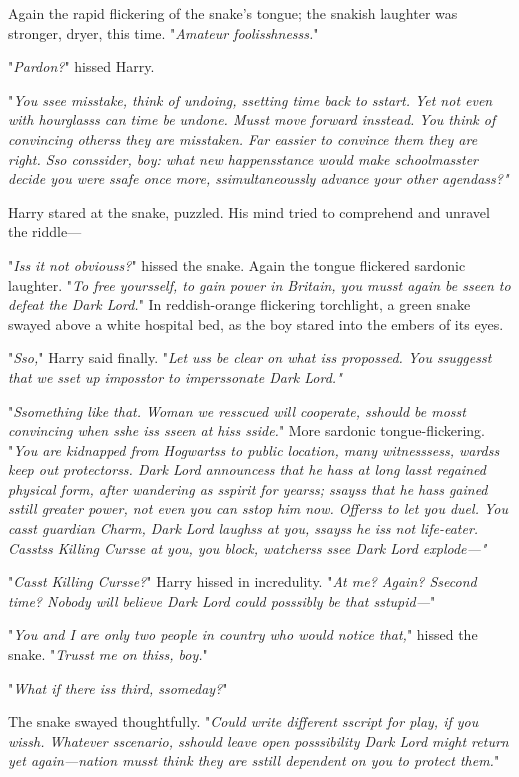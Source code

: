 Again the rapid flickering of the snake's tongue; the snakish laughter was 
stronger, dryer, this time. "\emph{Amateur foolisshnesss.}"

"\emph{Pardon?}" hissed Harry.

"\emph{You ssee misstake, think of undoing, ssetting time back to sstart. Yet 
not even with hourglasss can time be undone. Musst move forward insstead. You 
think of convincing otherss they are misstaken. Far eassier to convince them 
they are right. Sso conssider, boy: what new happensstance would make 
schoolmasster decide you were ssafe once more, ssimultaneoussly advance your 
other agendass?"}

Harry stared at the snake, puzzled. His mind tried to comprehend and unravel 
the riddle---

"\emph{Iss it not obviouss?}" hissed the snake. Again the tongue flickered 
sardonic laughter. "\emph{To free yoursself, to gain power in Britain, you 
musst again be sseen to defeat the Dark Lord.}"
\sbreak
In reddish-orange flickering torchlight, a green snake swayed above a white 
hospital bed, as the boy stared into the embers of its eyes.

"\emph{Sso,}" Harry said finally. "\emph{Let uss be clear on what iss 
propossed. You ssuggesst that we sset up imposstor to imperssonate Dark Lord."}

"\emph{Ssomething like that. Woman we resscued will cooperate, sshould be mosst 
convincing when sshe iss sseen at hiss sside.}" More sardonic 
tongue-flickering. "\emph{You are kidnapped from Hogwartss to public location, 
many witnesssess, wardss keep out protectorss. Dark Lord announcess that he 
hass at long lasst regained physical form, after wandering as sspirit for 
yearss; ssayss that he hass gained sstill greater power, not even you can sstop 
him now. Offerss to let you duel. You casst guardian Charm, Dark Lord laughss 
at you, ssayss he iss not life-eater. Casstss Killing Cursse at you, you block, 
watcherss ssee Dark Lord explode---"}

"\emph{Casst Killing Cursse?}" Harry hissed in incredulity. "\emph{At me? 
Again? Ssecond time? Nobody will believe Dark Lord could posssibly be that 
sstupid---}"

"\emph{You and I are only two people in country who would notice that,}" hissed 
the snake. "\emph{Trusst me on thiss, boy.}"

"\emph{What if there iss third, ssomeday?}"

The snake swayed thoughtfully. "\emph{Could write different sscript for play, 
if you wissh. Whatever sscenario, sshould leave open posssibility Dark Lord 
might return yet again---nation musst think they are sstill dependent on you to 
protect them.}"


